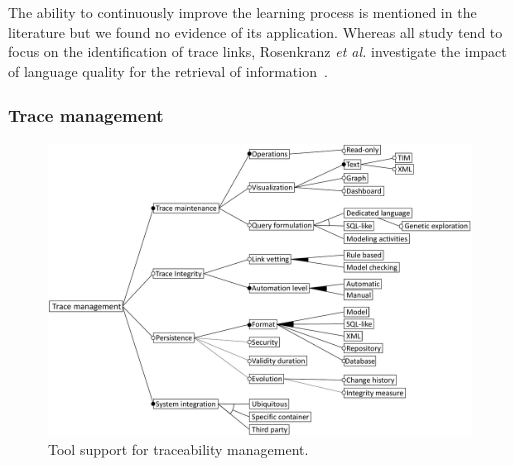 The ability to continuously improve the learning process is mentioned in the literature but we found no evidence of its application. 
Whereas all study tend to focus on the identification of trace links, Rosenkranz \textit{et al.} investigate the impact of language quality for the retrieval of information~\cite{Rosenkranz_2013}.


\subsubsection{Trace management}
\label{sec:fm:toolsupport}
\begin{figure}[h]
	\centering
	\includegraphics[width=.9\linewidth]{images/fm-toolsupport}
	\caption{Tool support for traceability management.}
	\label{fig:fm:management}
\end{figure}


